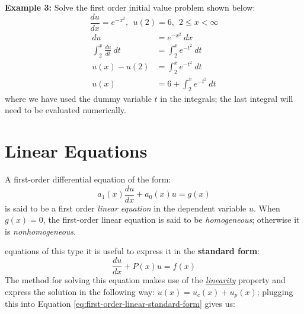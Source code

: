 \begin{example}[h!]
\textbf{Example 3:}
Solve the first order initial value problem shown below:
\begin{equation*}
\frac{du}{dx} = e^{-x^2}, \ \ u(2) = 6, \ \ 2 \le x < \infty
\end{equation*}
\begin{align*}
du &= e^{-x^2}\ dx \\
\int_2^{x} \frac{du}{dt} \ dt &= \int_{2}^{x} e^{-t^2} \ dt \\
u(x) - u(2) &= \int_{2}^{x} e^{-t^2} \ dt \\
u(x) &= 6 + \int_{2}^{x} e^{-t^2} \ dt
\end{align*}
where we have used the dummy variable $t$ in the integrals; the last integral will need to be evaluated numerically.

\end{example}

\section{Linear Equations}
A first-order differential equation of the form:
\begin{equation}
a_1(x)\frac{du}{dx} + a_0(x)u = g(x)
\label{eq:lin_first_order}
\end{equation}
is said to be a first order \emph{linear equation} in the dependent variable $u$.
When $g(x) = 0$, the first-order linear equation is said to be \emph{homogeneous}; otherwise it is \emph{nonhomogeneous}.

 equations of this type it is useful to express it in the \textbf{standard form}:
\begin{equation}
\frac{du}{dx}+P(x)u = f(x)
\label{eq:first-order-linear-standard-form}
\end{equation}  
The method for solving this equation makes use of the \underline{\emph{linearity}} property and express the solution in the following way: $u(x) = u_c(x) + u_p(x)$; plugging this into Equation \ref{eq:first-order-linear-standard-form} gives us:

